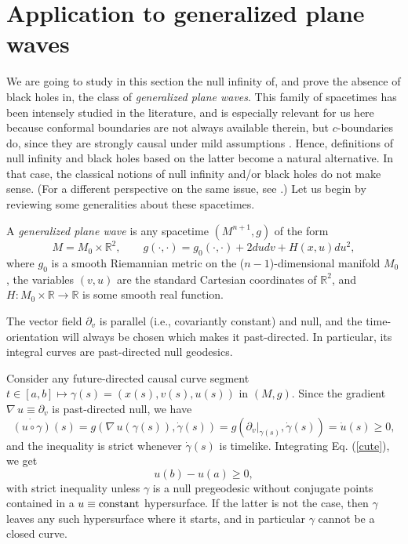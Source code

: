 \section{Application to generalized plane waves}\label{ppwaves}

We are going to study in this section the null infinity of, and prove the absence of black holes in, the class of {\em generalized plane waves}. This family of spacetimes has been intensely studied in the literature, and is especially relevant for us here because conformal boundaries are not always available therein, but $c$-boundaries do, since they are strongly causal under mild assumptions \cite[Section 3]{0264-9381-20-11-322}. Hence, definitions of null infinity and black holes based on the latter become a natural alternative. In that case, the classical notions of null infinity and/or black holes do not make sense. (For a different perspective on the same issue, see \cite{SenovillaNoBHinPPWaves2003}.) Let us begin by reviewing some generalities about these spacetimes.

A {\em generalized plane wave} is any spacetime $(M^{n+1},g)$ of the form
\begin{equation}\label{pfw}
M=M_0 \times \mathbb{R}^2,\qquad
g(\cdot,\cdot) = g_0(\cdot,\cdot) + 2dudv + H(x,u)du^2,
\end{equation}
where $g_0$ is a smooth Riemannian metric on the ($n-1$)-dimensional manifold $M_0$, the variables $(v,u)$ are the standard Cartesian coordinates of $\mathbb{R}^2$, and $H:M_0 \times \mathbb{R} \rightarrow \mathbb{R}$ is some smooth real function.

The vector field $\partial_v$ is parallel (i.e.,
covariantly constant) and null, and the time-orientation will
always be chosen which makes it past-directed. In particular, its integral curves are past-directed null geodesics.

Consider any future-directed
causal curve segment $t \in [a,b] \mapsto \gamma(s)=(x(s),v(s),u(s))$ in $(M,g)$. Since the gradient $\nabla \,u \equiv \partial_v$ is past-directed null, we have
\begin{equation}
\label{cute}
\dot{(u\circ \gamma)}(s) = g(\nabla \, u (\gamma(s)), \dot \gamma(s)) = g(\partial_v|_{\gamma(s)},\dot \gamma(s)) = \dot u(s) \geq 0,
\end{equation}
and the inequality is strict whenever $\dot \gamma(s)$ is timelike. Integrating Eq. (\ref{cute}), we get
\[
u(b) - u(a)\geq 0,
\]
with strict inequality unless $\gamma$ is a null pregeodesic without conjugate points contained in a $u\equiv\hbox{constant}$ hypersurface. If the latter is not the case, then $\gamma$ leaves any such hypersurface where it starts, and in particular $\gamma$ cannot be a closed curve.

